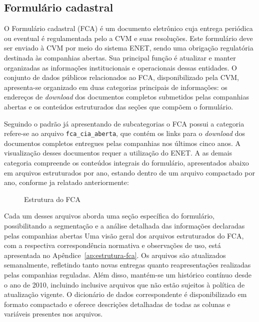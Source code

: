 \subsection{Formulário cadastral}

O Formulário cadastral (FCA) é um documento eletrônico cuja entrega periódica ou eventual é regulamentada pelo a CVM e suas resoluções. Este formulário deve ser enviado à CVM por meio do sistema ENET, sendo uma obrigação regulatória destinada às companhias abertas. Sua principal função é atualizar e manter organizadas as informações institucionais e operacionais dessas entidades. O conjunto de dados públicos relacionados ao FCA, disponibilizado pela CVM, apresenta-se organizado em duas categorias principais de informações: os endereços de \textit{download} dos documentos completos submetidos pelas companhias abertas e os conteúdos estruturados das seções que compõem o formulário.

Seguindo o padrão já apresentando de subcategorias o FCA possui a categoria refere-se ao arquivo \texttt{fca\_cia\_aberta}, que contém os links para o \textit{download} dos documentos completos entregues pelas companhias nos últimos cinco anos. A visualização desses documentos requer a utilização do ENET. A as demais categoria compreende os conteúdos integrais do formulário, apresentados abaixo em arquivos estruturados por ano, estando dentro de um arquivo compactado por ano, conforme ja relatado anteriormente: 

\begin{figure}[!htb] \centering
	\caption{Estrutura do FCA} \label{fig:estrutura_fca}
	\begin{varwidth}{\linewidth}
	\end{varwidth}
\end{figure}

Cada um desses arquivos aborda uma seção específica do formulário, possibilitando a segmentação e a análise detalhada das informações declaradas pelas companhias abertas Uma visão geral dos arquivos estruturados do FCA, com a respectiva correspondência normativa e observações de uso, está apresentada no Apêndice~\ref{ap:estrutura-fca}. Os arquivos são atualizados semanalmente, refletindo tanto novas entregas quanto reapresentações realizadas pelas companhias reguladas. Além disso, mantém-se um histórico contínuo desde o ano de 2010, incluindo inclusive arquivos que não estão sujeitos à política de atualização vigente. O dicionário de dados correspondente é disponibilizado em formato compactado e oferece descrições detalhadas de todas as colunas e variáveis presentes nos arquivos.


